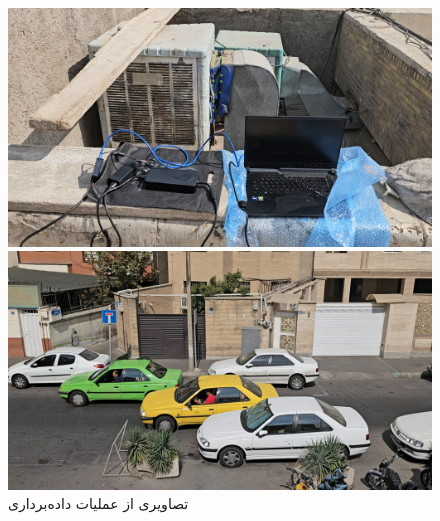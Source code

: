 \begin{figure}[h!]
    \begin{minipage}{0.5\textwidth}
        \centering
        \includegraphics[width=1\linewidth]{figures/Lidar_Data_Acquisition1.png}
    \end{minipage}
    \hspace{0.3cm}
    \begin{minipage}{0.5\textwidth}
        \centering
        \includegraphics[width=1\linewidth]{figures/Data_Acquisition_Video.png}
    \end{minipage}
    \begin{center}
        \caption{تصاویری از عملیات داده‌برداری}
    \end{center}
    \label{fig:Data_Acquistion}
\end{figure}

